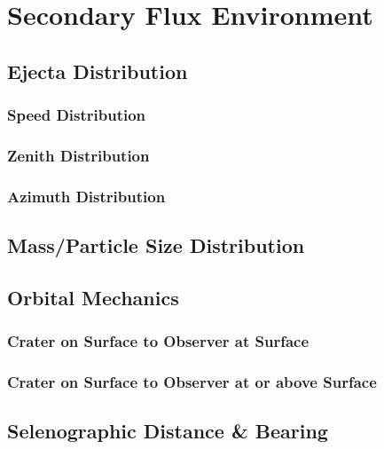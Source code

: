 \documentclass{article}
\begin{document}
\section{Secondary Flux Environment}





\subsection{Ejecta Distribution}


\subsubsection{Speed Distribution}



\subsubsection{Zenith Distribution}


\subsubsection{Azimuth Distribution}


\subsection{Mass/Particle Size Distribution}\label{ssec:Mass/Particle Size Distribution}


\subsection{Orbital Mechanics}

\subsubsection{Crater on Surface to Observer at Surface}

\subsubsection{Crater on Surface to Observer at or above Surface}

\subsection{Selenographic Distance \& Bearing}
\end{document}
